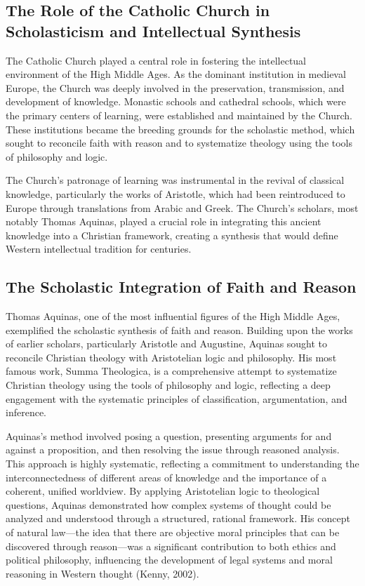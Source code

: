 \documentclass[twocolumn]{article}
\begin{document}
\subsection{The Role of the Catholic Church in Scholasticism and Intellectual Synthesis}

\textcolor{primary}{The Catholic Church played a central role in fostering the intellectual environment of the High Middle Ages. As the dominant institution in medieval Europe, the Church was deeply involved in the preservation, transmission, and development of knowledge. Monastic schools and cathedral schools, which were the primary centers of learning, were established and maintained by the Church. These institutions became the breeding grounds for the scholastic method, which sought to reconcile faith with reason and to systematize theology using the tools of philosophy and logic.}

\textcolor{secondary}{The Church's patronage of learning was instrumental in the revival of classical knowledge, particularly the works of Aristotle, which had been reintroduced to Europe through translations from Arabic and Greek. The Church’s scholars, most notably Thomas Aquinas, played a crucial role in integrating this ancient knowledge into a Christian framework, creating a synthesis that would define Western intellectual tradition for centuries.}

\subsection{The Scholastic Integration of Faith and Reason}

\textcolor{primary}{Thomas Aquinas, one of the most influential figures of the High Middle Ages, exemplified the scholastic synthesis of faith and reason. Building upon the works of earlier scholars, particularly Aristotle and Augustine, Aquinas sought to reconcile Christian theology with Aristotelian logic and philosophy. His most famous work, Summa Theologica, is a comprehensive attempt to systematize Christian theology using the tools of philosophy and logic, reflecting a deep engagement with the systematic principles of classification, argumentation, and inference.}

\textcolor{secondary}{Aquinas's method involved posing a question, presenting arguments for and against a proposition, and then resolving the issue through reasoned analysis. This approach is highly systematic, reflecting a commitment to understanding the interconnectedness of different areas of knowledge and the importance of a coherent, unified worldview. By applying Aristotelian logic to theological questions, Aquinas demonstrated how complex systems of thought could be analyzed and understood through a structured, rational framework. His concept of natural law—the idea that there are objective moral principles that can be discovered through reason—was a significant contribution to both ethics and political philosophy, influencing the development of legal systems and moral reasoning in Western thought (Kenny, 2002).}
\end{document}

